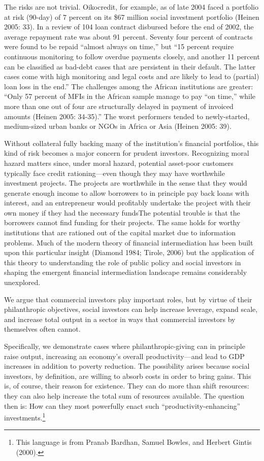 \documentclass{article} %
\begin{document}
The risks are not trivial. Oikocredit, for example, as of late 2004 faced a portfolio at risk (90-day) of 7 percent on its \$67 million social investment portfolio (Heinen 2005: 33).  In a review of 104 loan contract disbursed before the end of 2002, the average repayment rate was about 91 percent. Seventy four percent of contracts were found to be repaid ``almost always on time,'' but ``15 percent require continuous monitoring to follow overdue payments closely, and another 11 percent can be classified as bad-debt cases that are persistent in their default. The latter cases come with high monitoring and legal costs and are likely to lead to (partial) loan loss in the end.'' The challenges among the African institutions are greater: ``Only 57 percent of MFIs in the African sample manage to pay ``on time,'' while more than one out of four are structurally delayed in payment of invoiced amounts (Heinen 2005: 34-35).''  The worst performers tended to newly-started, medium-sized urban banks or NGOs in Africa or Asia (Heinen 2005: 39). 

Without collateral fully backing many of the institution's financial portfolios, this kind of risk becomes a major concern for prudent investors. Recognizing moral hazard matters since, under moral hazard, potential asset-poor customers typically face credit rationing---even though they may have worthwhile investment projects. The projects are worthwhile in the sense that they would generate enough income to allow borrowers to in principle pay back loans with interest, and an entrepreneur would profitably undertake the project with their own money if they had the necessary fundsThe potential trouble is that the borrowers cannot find funding for their projects. The same holds for worthy institutions that are rationed out of the capital market due to information problems.  Much of the modern theory of financial intermediation has been built upon this particular insight (Diamond 1984; Tirole, 2006) but the application of this theory to understanding the role of public policy and social investors in shaping the emergent financial intermediation landscape remains considerably unexplored. 

We argue that commercial investors play important roles, but by virtue of their philanthropic objectives, social investors can help increase leverage, expand scale, and increase total output in a sector in ways that commercial investors by themselves often cannot. 

Specifically, we demonstrate cases where philanthropic-giving can in principle raise output, increasing an economy's overall productivity---and lead to GDP increases in addition to poverty reduction. The possibility arises because social investors, by definition, are willing to absorb costs in order to bring gains. This is, of course, their reason for existence. They can do more than shift resources: they can also help increase the total sum of resources available. The question then is: How can they most powerfully enact such ``productivity-enhancing'' investments.\footnote{  This language is from Pranab Bardhan, Samuel Bowles, and Herbert Gintis (2000). } 
\end{document}
